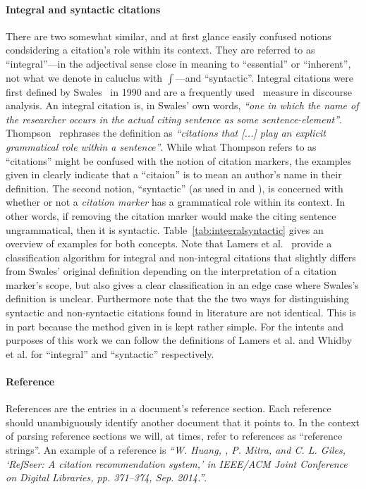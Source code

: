 \paragraph{Integral and syntactic citations} There are two somewhat similar, and at first glance easily confused notions condsidering a citation's role within its context. They are referred to as ``integral''---in the adjectival sense close in meaning to ``essential'' or ``inherent'', not what we denote in caluclus with $\int$---and ``syntactic''. Integral citations were first defined by Swales~\cite{Swales1990} in 1990 and are a frequently used~\cite{Hyland1999,Thompson2001,Okamura2008,Lamers2018} measure in discourse analysis. An integral citation is, in Swales' own words, \emph{``one in which the name of the researcher occurs in the actual citing sentence as some sentence-element''}. Thompson~\cite{Thompson2001} rephrases the definition as \emph{``citations that [...] play an explicit grammatical role within a sentence''}. While what Thompson refers to as ``citations'' might be confused with the notion of citation markers, the examples given in \cite{Thompson2001} clearly indicate that a ``citaion'' is to mean an author's name in their definition. The second notion, ``syntactic'' (as used in \cite{Whidby2011} and \cite{Abujbara2012}), is concerned with whether or not a \emph{citation marker} has a grammatical role within its context. In other words, if removing the citation marker would make the citing sentence ungrammatical, then it is syntactic. Table~\ref{tab:integralsyntactic} gives an overview of examples for both concepts. Note that Lamers et al.~\cite{Lamers2018} provide a classification algorithm for integral and non-integral citations that slightly differs from Swales' original definition depending on the interpretation of a citation marker's scope, but also gives a clear classification in an edge case where Swales's definition is unclear. Furthermore note that the the two ways for distinguishing syntactic and non-syntactic citations found in literature are not identical. This is in part because the method given in \cite{Abujbara2012} is kept rather simple. For the intents and purposes of this work we can follow the definitions of Lamers et al. and Whidby et al. for ``integral'' and ``syntactic'' respectively.
\paragraph{Reference} References are the entries in a document's reference section. Each reference should unambiguously identify another document that it points to. In the context of parsing reference sections we will, at times, refer to references as ``reference strings''. An example of a reference is \emph{``W. Huang, , P. Mitra, and C. L. Giles, `RefSeer: A citation recommendation system,' in IEEE/ACM Joint Conference on Digital Libraries, pp. 371–374, Sep. 2014.''}.

